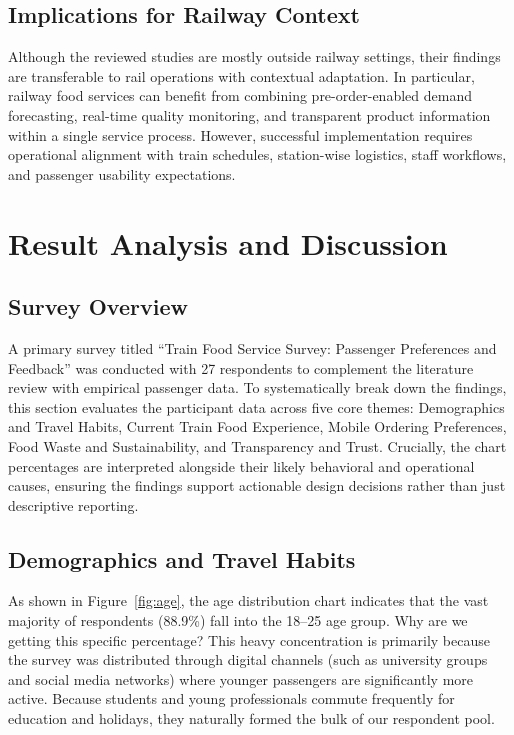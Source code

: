 \documentclass[conference]{IEEEtran}
\begin{document}
\subsection{Implications for Railway Context}

Although the reviewed studies are mostly outside railway settings, their findings are transferable to rail operations with contextual adaptation. In particular, railway food services can benefit from combining pre-order-enabled demand forecasting, real-time quality monitoring, and transparent product information within a single service process. However, successful implementation requires operational alignment with train schedules, station-wise logistics, staff workflows, and passenger usability expectations.



\section{Result Analysis and Discussion}

\subsection{Survey Overview}

A primary survey titled ``Train Food Service Survey: Passenger Preferences and Feedback'' was conducted with 27 respondents to complement the literature review with empirical passenger data. To systematically break down the findings, this section evaluates the participant data across five core themes: Demographics and Travel Habits, Current Train Food Experience, Mobile Ordering Preferences, Food Waste and Sustainability, and Transparency and Trust. Crucially, the chart percentages are interpreted alongside their likely behavioral and operational causes, ensuring the findings support actionable design decisions rather than just descriptive reporting.

\subsection{Demographics and Travel Habits}

As shown in Figure~\ref{fig:age}, the age distribution chart indicates that the vast majority of respondents (88.9\%) fall into the 18--25 age group. Why are we getting this specific percentage? This heavy concentration is primarily because the survey was distributed through digital channels (such as university groups and social media networks) where younger passengers are significantly more active. Because students and young professionals commute frequently for education and holidays, they naturally formed the bulk of our respondent pool.
\end{document}
